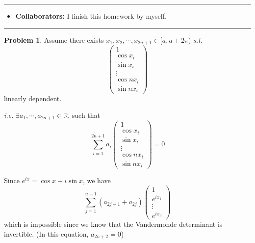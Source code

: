 \documentclass[a4paper]{article}
\theoremstyle{definition}
\newtheorem{problem}{Problem}
\theoremstyle{plain}
\newcommand{\Rbb}{\mathbb R}
\newcommand{\<}{\left<}
\renewcommand{\>}{\right>}
\numberwithin{equation}{problem}
\newcommand{\ie}{ \textit{ i.e. } }
\newcommand{\st}{ \textit{ s.t. }}
\begin{document}
\courseheader
{}
\rule{\textwidth}{1pt}
\begin{itemize}
\item {\bf Collaborators: \/}
  I finish this homework by myself. 
\end{itemize}
\rule{\textwidth}{1pt}

\vspace{2em}

\sloppy
{}

\begin{problem}
    Assume there exists  $ x_1,x_2,\cdots,x_{2n+1}\in [a,a+2\pi) $ \st    
    \[\begin{pmatrix}
        1\\
        \cos x_i\\
        \sin x_i\\
        \vdots\\
        \cos nx_i\\
        \sin nx_i
    \end{pmatrix}\]
    linearly dependent.

    \ie  $ \exists  a_1,\cdots,a_{2n+1}\in \Rbb $, such that 
    \[\sum_{i=1}^{2n+1}a_i \begin{pmatrix}
        1\\
        \cos x_i\\
        \sin x_i\\
        \vdots\\
        \cos nx_i\\
        \sin nx_i
    \end{pmatrix}=0\]

    Since  $ e^{i x}=\cos x+i\sin x $, we have 
    \[\sum_{j=1}^{n+1}(a_{2j-1}+a_{2j})\begin{pmatrix}
        1\\
        e^{ix_1}\\
        \vdots\\
        e^{ix_n}
    \end{pmatrix}\]
    which is impossible since we know that the Vandermonde determinant is invertible. (In this equation,  $ a_{2n+2}=0 $)

\end{problem}
\end{document}
